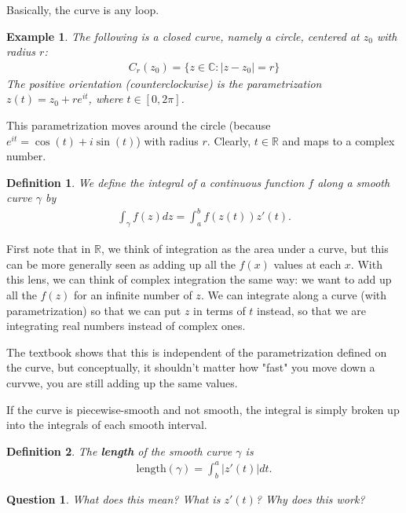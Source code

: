 \documentclass[12pt]{article}
\newtheorem{definition}{Definition}
\newtheorem{question}{Question}
\newtheorem{example}{Example}
\begin{document}
Basically, the curve is any loop. 

\begin{example}
  The following is a closed curve, namely a circle, centered at $z_0$ with radius $r$:
  \begin{align*}
    C_r(z_0) = \{ z \in \mathbb{C} : |z-z_0| = r\}
  \end{align*}
  The positive orientation (counterclockwise) is the parametrization $z(t) = z_0 + re^{it}$, where $t \in [0,2\pi]$. 
\end{example}

This parametrization moves around the circle (because $e^{it} = \cos(t) + i \sin(t)$) with radius $r$. 
Clearly, $t \in \mathbb{R}$ and maps to a complex number. 

\begin{definition}
  We define the integral of a continuous function $f$ along a smooth curve $\gamma$ by 
  \begin{align*}
    \int_{\gamma}f(z)dz = \int^b_a f(z(t))z'(t).
  \end{align*}
\end{definition}

First note that in $\mathbb{R}$, we think of integration as the area under a curve, but this can be more generally seen as adding up 
all the $f(x)$ values at each $x$. With this lens, we can think of complex integration the same way: we want to add up all the $f(z)$ for an 
infinite number of $z$. We can integrate along a curve (with parametrization) so that we can put $z$ in terms of $t$ instead, so that we are integrating 
real numbers instead of complex ones. 

\par The textbook shows that this is independent of the parametrization defined on the curve, but conceptually, it shouldn't matter how "fast" you 
move down a curvwe, you are still adding up the same values. 

\par If the curve is piecewise-smooth and not smooth, the integral is simply broken up into the integrals of each smooth interval. 

\begin{definition}
  The \textbf{length} of the smooth curve $\gamma$ is 
  \begin{align*}
    \text{length}(\gamma)=\int^a_b |z'(t)|dt.
  \end{align*}
\end{definition}

\begin{question}
  What does this mean? What is $z'(t)$? Why does this work?
\end{question}
\end{document}
